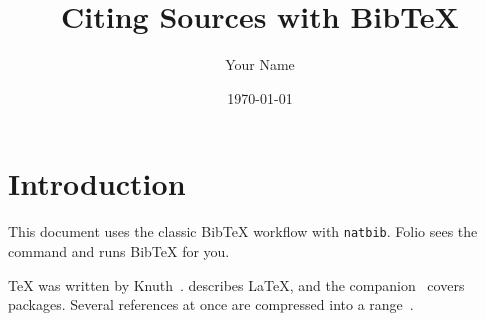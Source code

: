 \documentclass[11pt,a4paper]{article}
\title{Citing Sources with BibTeX}
\author{Your Name}
\date{\today}
\begin{document}
\maketitle

\section{Introduction}
This document uses the classic BibTeX workflow with \texttt{natbib}.
Folio sees the \verb|| command and runs BibTeX for you.

\TeX{} was written by Knuth~\citep{knuth1984}. \citet{lamport1994} describes
\LaTeX{}, and the companion~\citep{mittelbach2004} covers packages. Several
references at once are compressed into a range~\citep{knuth1984,lamport1994,mittelbach2004}.



\end{document}
